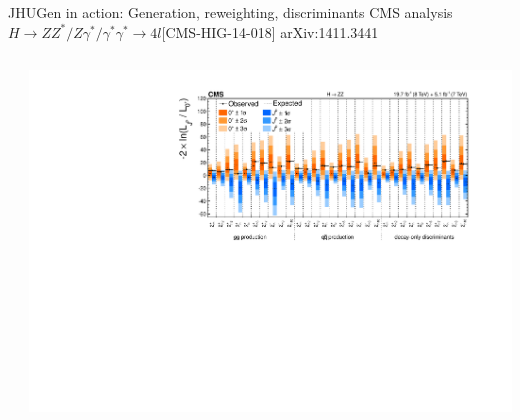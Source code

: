 \documentclass[usenames,dvipsnames,svgnames,table]{beamer}
\begin{document}
\begin{frame}{JHUGen in action: Generation, reweighting, discriminants}{
CMS analysis $H \to ZZ^*/Z\gamma^*/\gamma^*\gamma^* \to 4l$\hfill [CMS-HIG-14-018] arXiv:1411.3441
}
\begin{columns}
\begin{column}{0.6\textwidth}
\end{column}
\begin{column}{0.4\textwidth}
\includegraphics[width=\textwidth]{HVV/JP_SummaryPlot}
\end{column}
\end{columns}
\end{frame}
\end{document}
